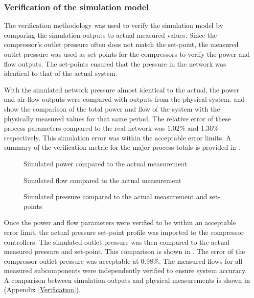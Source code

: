 	\subsubsection{Verification of the simulation model}
	The verification methodology was used to verify the simulation model by comparing the simulation outputs to actual measured values. Since the compressor's outlet pressure often does not match the  set-point, the measured outlet pressure was used as set points for the compressors to verify the power and flow outputs. The  set-points ensured that the pressure in the network was identical to that of the actual system.
	\par 
 With the simulated network pressure almost identical to the actual, the power and air-flow outputs were compared with outputs from the physical system.  and  show the comparison of the total power and flow of the system with the physically measured values for that same period. The relative error of these process parameters compared to the real network was $1.02 \%$ and $1.36 \%$ respectively. This simulation error was within the acceptable error limits. A summary of the  verification metric for the major process totals is provided in .
 \par
	\begin{figure}[h!]
		\centering
		
		\caption{Simulated power compared to the actual measurement}
		\label{fig: Verification Power kusasalethu}
	\end{figure}
	\begin{figure}[h!]
		\centering
		
		\caption{Simulated flow compared to the actual measurement}
		\label{fig: Verification Flow kusasalethu}
	\end{figure}
	 \begin{figure}[h!]
	 	\centering
	 	
	 	\caption{Simulated pressure compared to the actual measurement and  set-points}
	 	\label{fig: Verification Pressure kusasalethu Setpoint}
	 \end{figure}
	\clearpage
	Once the power and flow parameters were verified to be within an acceptable error limit, the actual pressure  set-point profile was imported to the compressor controllers. The simulated outlet pressure was then compared to the actual measured pressure and  set-point. This comparison is shown in . The error of the compressor outlet pressure was acceptable at 0.98\%. The measured flows for all measured subcomponents were independently verified to ensure system accuracy. A comparison between simulation outputs and physical measurements is shown in  (Appendix \ref{Verification}).	
